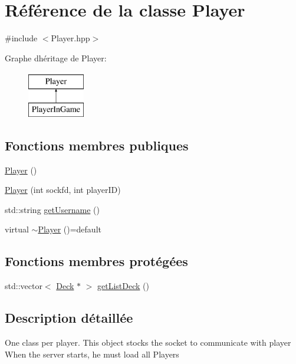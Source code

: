 \hypertarget{classPlayer}{}\section{Référence de la classe Player}
\label{classPlayer}


{\ttfamily \#include $<$Player.\+hpp$>$}

Graphe d\textquotesingle{}héritage de Player\+:\begin{figure}[H]
\begin{center}
\leavevmode
\includegraphics[height=2.000000cm]{classPlayer}
\end{center}
\end{figure}
\subsection*{Fonctions membres publiques}
\begin{DoxyCompactItemize}
\item 
\hyperlink{classPlayer_affe0cc3cb714f6deb4e62f0c0d3f1fd8}{Player} ()
\item 
\hyperlink{classPlayer_aa4306941986269f0c9237348d2b65d07}{Player} (int sockfd, int player\+I\+D)
\item 
std\+::string \hyperlink{classPlayer_a73c00480e9459d52998262f23f6fc5dc}{get\+Username} ()
\item 
virtual \hyperlink{classPlayer_a11017c0ed8a639f3b1308ab167fbeca2}{$\sim$\+Player} ()=default
\end{DoxyCompactItemize}
\subsection*{Fonctions membres protégées}
\begin{DoxyCompactItemize}
\item 
std\+::vector$<$ \hyperlink{classDeck}{Deck} $\ast$ $>$ \hyperlink{classPlayer_ad3e0232a0013556f3dc6a7cf3219c5e3}{get\+List\+Deck} ()
\end{DoxyCompactItemize}


\subsection{Description détaillée}
One class per player. This object stocks the socket to communicate with player When the server starts, he must load all Players 

